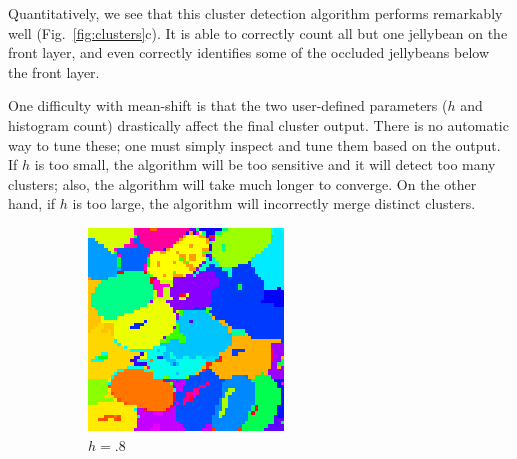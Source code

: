 \documentclass[12pt]{article}
\begin{document}
Quantitatively, we see that this cluster detection algorithm performs remarkably well (Fig.~\ref{fig:clusters}c). It is able to correctly count all but one jellybean on the front layer, and even correctly identifies some of the occluded jellybeans below the front layer.

One difficulty with mean-shift is that the two user-defined parameters ($h$ and histogram count) drastically affect the final cluster output. There is no automatic way to tune these; one must simply inspect and tune them based on the output. If $h$ is too small, the algorithm will be too sensitive and it will detect too many clusters; also, the algorithm will take much longer to converge. On the other hand, if $h$ is too large, the algorithm will incorrectly merge distinct clusters.

\begin{figure}
    \centering
  \begin{subfigure}[b]{0.3\textwidth}
      \includegraphics[width=\textwidth]{fig/ms3}
      \caption{$h=.8$}
  \end{subfigure}
   \begin{subfigure}[b]{0.3\textwidth}

\end{subfigure}
\end{figure}
\end{document}
